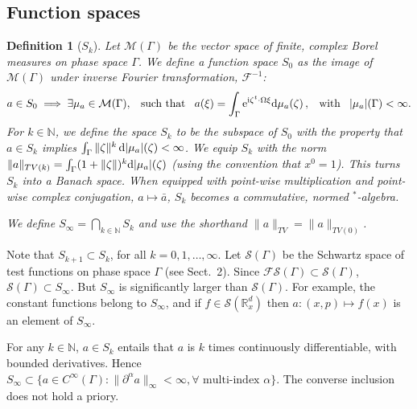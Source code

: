 \documentclass[11pt]{article}
\newcommand{\nn}{\mathbb{N}}
\newcommand{\rr}{\mathbb{R}}
\renewcommand{\d}{{\rm d}}
\newcommand{\e}{{\rm e}}
\renewcommand{\i}{{\rm i}}
\newtheorem{definition}[theorem]{Definition}
\begin{document}
\subsection{Function spaces}
\begin{definition}[$S_k$]
Let $\mathcal M(\Gamma)$ be the vector space of finite, complex Borel measures on phase space $\Gamma$. We define
a function space $S_0$ as the image of $\mathcal M(\Gamma)$ under inverse Fourier transformation, 
$\mathcal F^{-1}$:
\begin{equation}\label{Borel meas}
a\in S_0\implies \exists \mu_a\in \mathcal M(\Gamma), \,\ \mbox{ such that }\,\ a(\xi)=\int_\Gamma \e^{\i \zeta^{t}\cdot 
\Omega \xi}\d\mu_a(\zeta)\,,\,\ \mbox{ with }\,\ |\mu_a|(\Gamma)<\infty.
\end{equation}
For $k\in \nn$, we define the space $S_k$ to be the subspace of $S_0$ with the property that $a\in S_k$ implies 
$\int_\Gamma \|\zeta\|^k\, \d|\mu_a|(\zeta) <\infty$.
We equip $S_k$ with the norm $\|a\|_{TV(k)}=\int_\Gamma(1+\|\zeta\|)^k \d|\mu_a|(\zeta)$ (using the 
convention that $x^0=1$). This turns $S_k$ into a Banach space. When equipped with point-wise multiplication 
and point-wise complex conjugation, $a\mapsto\bar a$, $S_k$ becomes a commutative, normed $^{*}$-algebra.

We define $S_\infty=\bigcap_{k\in \nn} S_k$ and use the shorthand $\|a\|_{TV}=\|a\|_{TV(0)}$.
\end{definition}
Note that $S_{k+1}\subset S_k$, for all $k=0,1,\dotsc,\infty$. Let $\mathcal{S}(\Gamma)$ be the Schwartz space of 
test functions on phase space $\Gamma$ (see Sect.~2). Since $\mathcal F\mathcal S(\Gamma)\subset\mathcal S(\Gamma)$, 
$\mathcal S(\Gamma)\subset S_\infty$. But $S_\infty$ is significantly larger than $\mathcal S(\Gamma)$. 
For example, the constant functions belong to $S_\infty$, and if $f\in \mathcal S(\rr_x^d)$ then $a:(x,p)\mapsto f(x)$ 
is an element of $S_\infty$. 

For any $k\in \nn$, $a\in S_k$ entails that $a$ is $k$ times continuously differentiable, with bounded derivatives. Hence $S_\infty\subset \{a\in C^{\infty}(\Gamma) : \|\partial^\alpha a\|_\infty<\infty, \forall \mbox{ multi-index } \alpha\}$. The converse inclusion does not hold a priory.
\end{document}

